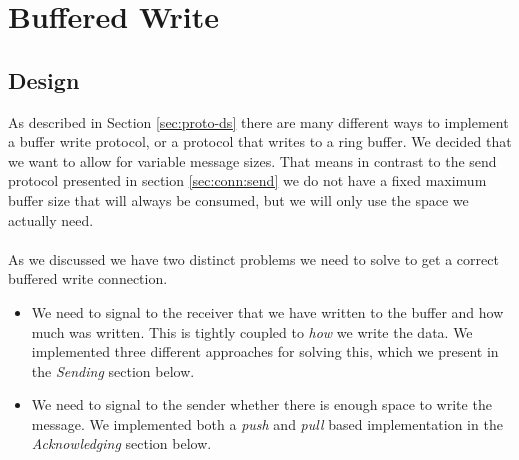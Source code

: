\section{Buffered Write} \label{sec:conn:buf_write}

\subsection{Design}
As described in Section \ref{sec:proto-ds} there are many different ways to implement a buffer write protocol, or a
protocol that writes to a ring buffer. We decided that we want to allow for variable message sizes. That means 
in contrast to the send protocol presented in section \ref{sec:conn:send} we do not have a fixed maximum buffer size
that will always be consumed, but we will only use the space we actually need.

\paragraph{} As we discussed we have two distinct problems we need to solve to get a correct buffered write connection.

\begin{itemize}
  \item We need to signal to the receiver that we have written to the buffer and how much was written. This is tightly 
    coupled to \emph{how} we write the data. We implemented three different approaches for solving this, which we present
    in the \emph{Sending} section below.
  \item We need to signal to the sender whether there is enough space to write the message. We implemented both a \emph{push}
    and \emph{pull} based implementation in the \emph{Acknowledging} section below.
\end{itemize}


